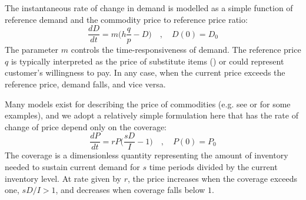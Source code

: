 \documentclass[12pt]{article}
\begin{document}
The instantaneous rate of change in demand is modelled as a simple function of reference demand and the commodity price to reference price ratio:
%
\begin{equation}
  \frac{dD}{dt} = m \Big( h \frac{q}{p} - D\Big) \quad, \quad D(0) = D_0
  \label{eq_demand}
\end{equation}
%
The parameter $m$ controls the time-responsiveness of demand. The reference price $q$ is typically interpreted as the price of substitute items (\cite{sterman2000}) or could represent customer's willingness to pay. In any case, when the current price exceeds the reference price, demand falls, and vice versa.

Many models exist for describing the price of commodities (e.g. see \cite{legrand2019} or \cite{deGoede2013} for some examples), and we adopt a relatively simple formulation here that has the rate of change of price depend only on the coverage:
%
\begin{equation}
  \frac{dP}{dt} = r P \Big(\frac{sD}{I} - 1\Big) \quad, \quad P(0) = P_0
  \label{eq_price}
\end{equation}
%
The coverage is a dimensionless quantity representing the amount of inventory needed to sustain current demand for $s$ time periods divided by the current inventory level. At rate given by $r$, the price increases when the coverage exceeds one, $sD/I > 1$, and decreases when coverage falls below $1$.
\end{document}

